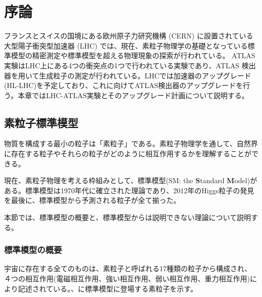 \chapter{序論}
\label{sec:josho}

フランスとスイスの国境にある欧州原子力研究機構 (CERN) に設置されている大型陽子衝突型加速器 (LHC) では、現在、素粒子物理学の基礎となっている標準模型の精密測定や標準模型を超える物理現象の探索が行われている。 ATLAS実験はLHC上にある4つの衝突点の1つで行われている実験であり、ATLAS 検出器を用いて生成粒子の測定が行われている。LHCでは加速器のアップグレード(HL-LHC)を予定しており、これに向けてATLAS検出器のアップグレードを行う。本章ではLHC-ATLAS実験とそのアップグレード計画について説明する。



\section{素粒子標準模型}
\label{sec:soryuushi}
物質を構成する最小の粒子は「素粒子」である。素粒子物理学を通して、自然界に存在する粒子やそれらの粒子がどのように相互作用するかを理解することができる。

現在、素粒子物理を考える枠組みとして、標準模型(SM: the \textbf{S}tandard \textbf{M}odel)がある。標準模型は1970年代に確立された理論であり、2012年のHiggs粒子の発見を最後に、標準模型から予測される粒子が全て揃った。

本節では、標準模型の概要と、標準模型からは説明できない理論について説明する。


\subsection{標準模型の概要}
\label{sec:sm}

宇宙に存在する全てのものは、素粒子と呼ばれる17種類の粒子から構成され、４つの相互作用(電磁相互作用、強い相互作用、弱い相互作用、重力相互作用)により記述されている。、に標準模型に登場する素粒子を示す。

